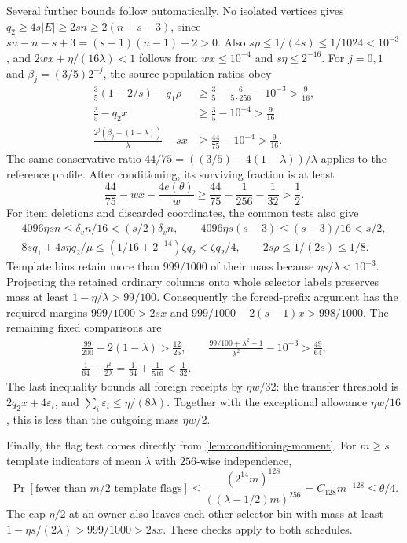 \documentclass[11pt]{article} \usepackage[utf8]{inputenc}
\theoremstyle{plain} \newtheorem{theorem}{Theorem}[section]
\theoremstyle{definition} \newaliascnt{definition}{theorem}
\begin{document}
Several further bounds follow automatically. No isolated vertices gives
$q_2\ge4s|E|\ge2sn\ge2(n+s-3)$, since
$sn-n-s+3=(s-1)(n-1)+2>0$. Also
$s\rho\le1/(4s)\le1/1024<10^{-3}$, and
$2wx+\eta/(16\lambda)<1$ follows from $wx\le10^{-4}$ and $s\eta\le2^{-16}$.
For $j=0,1$ and $\beta_j=(3/5)2^{-j}$, the source population ratios obey
\[
\begin{aligned}
\frac35(1-2/s)-q_1\rho
 &\ge\frac35-\frac6{5\cdot256}-10^{-3}>\frac9{16},\\
\frac35-q_2x&\ge\frac35-10^{-4}>\frac9{16},\\
\frac{2^j(\beta_j-(1-\lambda))}{\lambda}-sx
 &\ge\frac{44}{75}-10^{-4}>\frac9{16}.
\end{aligned}
\]
The same conservative ratio $44/75=((3/5)-4(1-\lambda))/\lambda$
applies to the reference profile. After conditioning, its surviving fraction
is at least
\[
\frac{44}{75}-wx-\frac{4e(\theta)}w
\ge\frac{44}{75}-\frac1{256}-\frac1{32}>\frac12.
\]
For item deletions and discarded coordinates, the common tests also give
\[
\begin{gathered}
4096\eta sn\le\delta_v n/16<(s/2)\delta_v n,\qquad
4096\eta s(s-3)\le(s-3)/16<s/2,\\
8sq_1+4s\eta q_2/\mu
\le(1/16+2^{-14})\zeta q_2<\zeta q_2/4,\qquad
2s\rho\le1/(2s)\le1/8.
\end{gathered}
\]
Template bins retain more than $999/1000$ of their mass because
$\eta s/\lambda<10^{-3}$. Projecting the retained ordinary columns onto
whole selector labels preserves mass at least $1-\eta/\lambda>99/100$.
Consequently the forced-prefix argument has the required margins
$999/1000>2sx$ and $999/1000-2(s-1)x>998/1000$.
The remaining fixed comparisons are
\[
\begin{gathered}
\frac{99}{200}-2(1-\lambda)>\frac{12}{25},\qquad
\frac{99/100+\lambda^2-1}{\lambda^2}-10^{-3}>\frac{49}{64},\\
\frac1{64}+\frac{\mu}{2\lambda}
=\frac1{64}+\frac1{510}<\frac1{32}.
\end{gathered}
\]
The last inequality bounds all foreign receipts by $\eta w/32$:
the transfer threshold is $2q_2x+4\varepsilon_i$, and
$\sum_i\varepsilon_i\le\eta/(8\lambda)$.
Together with the exceptional allowance $\eta w/16$, this is less than
the outgoing mass $\eta w/2$.

Finally, the flag test comes directly from \cref{lem:conditioning-moment}.
For $m\ge s$ template indicators of mean $\lambda$ with $256$-wise independence,
\[
\Pr[\text{fewer than }m/2\text{ template flags}]
\le\frac{(2^{14}m)^{128}}{((\lambda-1/2)m)^{256}}
=C_{128}m^{-128}\le\theta/4.
\]
The cap $\eta/2$ at an owner also leaves each other selector bin with mass
at least $1-\eta s/(2\lambda)>999/1000>2sx$.
These checks apply to both schedules.
\end{document}
